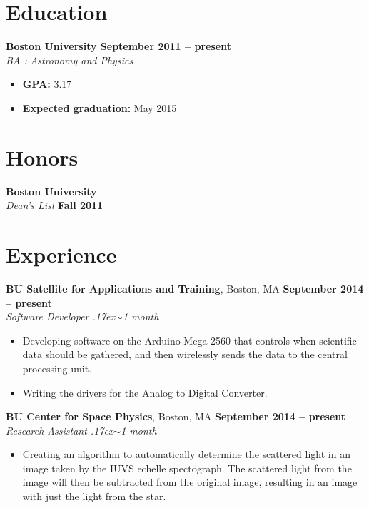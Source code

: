 \documentclass[margin,line]{resume}
\newcommand{\about}{\raise.17ex\hbox{$\scriptstyle\mathtt{\sim}$}}
\begin{document}
\begin{resume}
    \section{\mysidestyle Education}
    \textbf{Boston University \hfill September 2011 -- present} \\
    \textsl{BA : Astronomy and Physics}
    \vspace{1mm}
    \begin{itemize}[leftmargin=2em]
        \item \textbf{GPA:} 3.17
        \item \textbf{Expected graduation:} May 2015
    \end{itemize}
    
    
    \section{\mysidestyle Honors}
    \textbf{Boston University} \\
    \textsl{Dean's List} \hfill \textbf{Fall 2011}
    
    
    \section{\mysidestyle Experience}
    
    \textbf{BU Satellite for Applications and Training}, Boston, MA \hfill \textbf{September 2014 -- present} \\
    \textsl{Software Developer \hfill \about 1 month}
    \vspace{1mm}
    \begin{itemize}[leftmargin=2em]
        \item Developing software on the Arduino Mega 2560 that controls when
        scientific data should be gathered, and then wirelessly sends the data to the
        central processing unit.
        \item Writing the drivers for the Analog to Digital Converter.
    \end{itemize}

    \textbf{BU Center for Space Physics}, Boston, MA \hfill \textbf{September 2014 -- present} \\
    \textsl{Research Assistant \hfill \about 1 month}
    \vspace{1mm}
    \begin{itemize}[leftmargin=2em]
        \item Creating an algorithm to automatically determine the scattered light in
        an image taken by the IUVS echelle spectograph. The scattered light from the
        image will then be subtracted from the original image, resulting in an image
        with just the light from the star.
    \end{itemize}
    

\end{resume}
\end{document}
